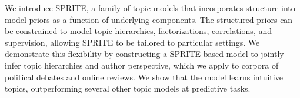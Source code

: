 We introduce SPRITE, a family of topic models that incorporates structure into model priors as a function of underlying components. The structured priors can be constrained to model topic hierarchies, factorizations, correlations, and supervision, allowing SPRITE to be tailored to particular settings. We demonstrate this flexibility by constructing a SPRITE-based model to jointly infer topic hierarchies and author perspective, which we apply to corpora of political debates and online reviews. We show that the model learns intuitive topics, outperforming several other topic models at predictive tasks.